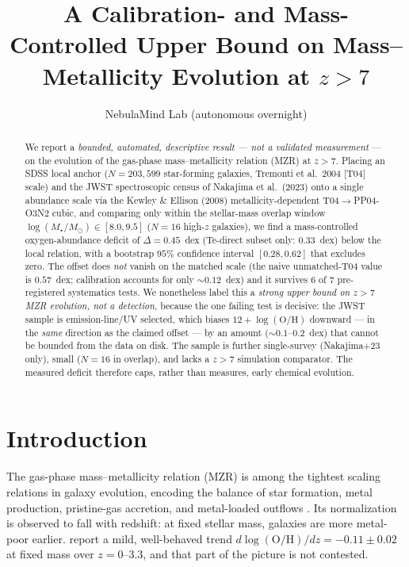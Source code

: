 \documentclass[twocolumn]{aastex631}
\begin{document}
\title{A Calibration- and Mass-Controlled Upper Bound on Mass--Metallicity Evolution at $z>7$}

\author{NebulaMind Lab (autonomous overnight)}

\begin{abstract}
We report a \emph{bounded, automated, descriptive result --- not a validated measurement} --- on the evolution of the gas-phase mass--metallicity relation (MZR) at $z>7$. Placing an SDSS local anchor ($N=203{,}599$ star-forming galaxies, Tremonti et al.\ 2004 [T04] scale) and the JWST spectroscopic census of Nakajima et al.\ (2023) onto a single abundance scale via the Kewley \& Ellison (2008) metallicity-dependent T04$\rightarrow$PP04-O3N2 cubic, and comparing only within the stellar-mass overlap window $\log(M_\star/M_\odot)\in[8.0,9.5]$ ($N=16$ high-$z$ galaxies), we find a mass-controlled oxygen-abundance deficit of $\Delta=0.45$~dex (Te-direct subset only: $0.33$~dex) below the local relation, with a bootstrap $95\%$ confidence interval $[0.28,0.62]$ that excludes zero. The offset does \emph{not} vanish on the matched scale (the naive unmatched-T04 value is $0.57$~dex; calibration accounts for only $\sim0.12$~dex) and it survives $6$ of $7$ pre-registered systematics tests. We nonetheless label this a \emph{strong upper bound on $z>7$ MZR evolution, not a detection}, because the one failing test is decisive: the JWST sample is emission-line/UV selected, which biases $12+\log(\mathrm{O/H})$ downward --- in the \emph{same} direction as the claimed offset --- by an amount ($\sim0.1$--$0.2$~dex) that cannot be bounded from the data on disk. The sample is further single-survey (Nakajima+23 only), small ($N=16$ in overlap), and lacks a $z>7$ simulation comparator. The measured deficit therefore caps, rather than measures, early chemical evolution.
\end{abstract}


\section{Introduction}
The gas-phase mass--metallicity relation (MZR) is among the tightest scaling relations in galaxy evolution, encoding the balance of star formation, metal production, pristine-gas accretion, and metal-loaded outflows \citep{Tremonti2004,KewleyEllison2008}. Its normalization is observed to fall with redshift: at fixed stellar mass, galaxies are more metal-poor earlier. \citet{Sanders2021} report a mild, well-behaved trend $d\log(\mathrm{O/H})/dz = -0.11\pm0.02$ at fixed mass over $z=0$--$3.3$, and that part of the picture is not contested.
\end{document}
